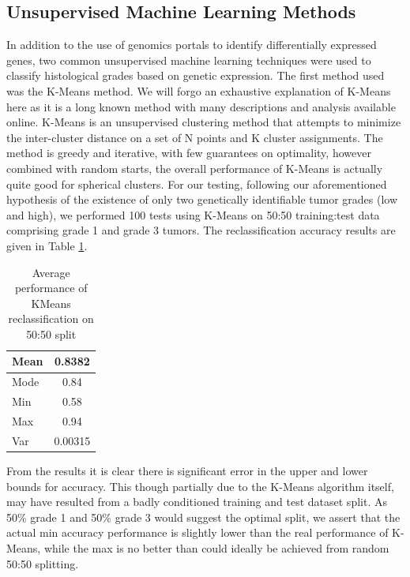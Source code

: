 \documentclass[a4paper,10pt]{article}
\begin{document}
\subsection{Unsupervised Machine Learning Methods}
In addition to the use of genomics portals to identify differentially expressed genes, two common unsupervised machine learning techniques were
used to classify histological grades based on genetic expression. The first method used was the K-Means method. We will forgo an exhaustive explanation
of K-Means here as it is a long known method with many descriptions and analysis available online. K-Means is an unsupervised clustering method
that attempts to minimize the inter-cluster distance on a set of N points and K cluster assignments. The method is greedy and iterative, with few guarantees
on optimality, however combined with random starts, the overall performance of K-Means is actually quite good for spherical clusters\cite{kmeans}. 
For our testing, following our aforementioned hypothesis of the existence of only two genetically identifiable tumor grades (low and high), we performed
100 tests using K-Means on 50:50 training:test data comprising grade 1 and grade 3 tumors. The reclassification accuracy results are given in Table \ref{Tkm}.\\
\begin{table}
\begin{center}
\begin{tabular}{| l | c | }
    \hline
    Mean & 0.8382  \\ \hline
    Mode & 0.84 \\ \hline
    Min & 0.58  \\ \hline
    Max & 0.94  \\ \hline
     Var &  0.00315  \\ \hline
  \end{tabular}
\end{center}
\caption{Average performance of KMeans reclassification on 50:50 split}\label{Tkm}
\end{table}

From the results it is clear there is significant error in the upper and lower bounds for accuracy. This though partially due to the K-Means algorithm
itself, may have resulted from a badly conditioned training and test dataset split. As 50\% grade 1 and 50\% grade 3 would suggest the optimal split,
we assert that the actual min accuracy performance is slightly lower than the real performance of K-Means, while the max is no better than could
ideally be achieved from random 50:50 splitting.\\
\end{document}
